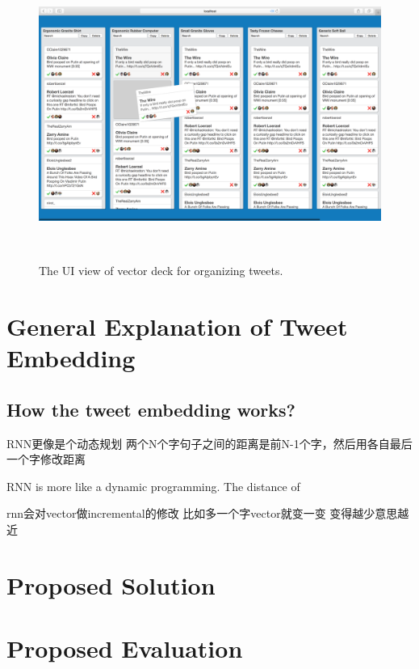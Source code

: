 \begin{figure}[thb!]
    \includegraphics[width= \textwidth]{images/vector_deck}
   \caption{The UI view of vector deck for organizing tweets.  } ~\label{fig: vector_deck}
\end{figure}


\section{General Explanation of Tweet Embedding}

\subsection{How the tweet embedding works?}


RNN更像是个动态规划
两个N个字句子之间的距离是前N-1个字，然后用各自最后一个字修改距离



RNN is more like a dynamic programming. The distance of 

rnn会对vector做incremental的修改
比如多一个字vector就变一变
变得越少意思越近





\subsection{}






\section{Proposed Solution}


\section{Proposed Evaluation}

